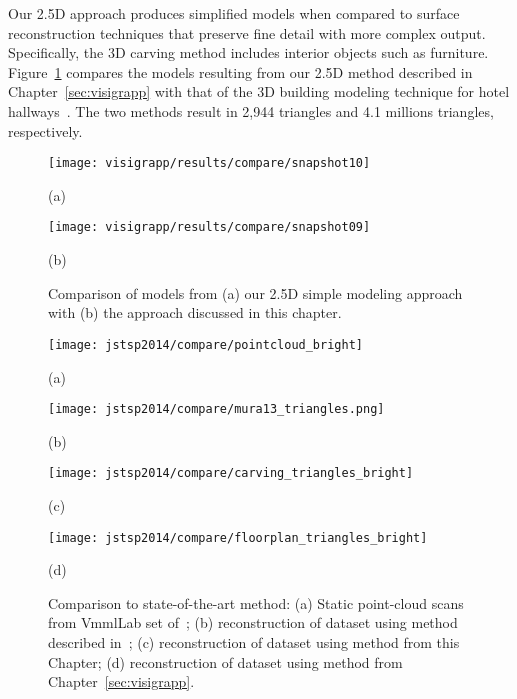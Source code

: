 \documentclass[12pt,onecolumn,oneside]{book}
\begin{document}
Our 2.5D approach produces simplified models when compared to surface reconstruction techniques that preserve fine detail with more complex output.  Specifically, the 3D carving method includes interior objects such as furniture.  Figure~\ref{fig:visigrapp_compare_to_carving} compares the models resulting from our 2.5D method described in Chapter~\ref{sec:visigrapp} with that of the 3D building modeling technique for hotel hallways~\cite{Turner14}.  The two methods result in 2,944 triangles and 4.1 millions triangles, respectively.

\begin{figure}
   \centering
   \begin{minipage}[b]{0.49\linewidth}
   \texttt{[image: visigrapp/results/compare/snapshot10]}
   \centerline{(a)}
   \end{minipage}
   \hfill
   \begin{minipage}[b]{0.49\linewidth}
   \texttt{[image: visigrapp/results/compare/snapshot09]}
   \centerline{(b)}
   \end{minipage}
   \caption[Comparison of 2.5D simple model with a 3D carved model.]{Comparison of models from (a) our 2.5D simple modeling approach with (b) the approach discussed in this chapter.}
   \label{fig:visigrapp_compare_to_carving}
\end{figure}

\begin{figure}[t]

	\begin{minipage}[b]{0.58\linewidth}
		\centerline{\texttt{[image: jstsp2014/compare/pointcloud\_bright]}}
		\centerline{(a)}\medskip
	\end{minipage}
	\hfill
	\begin{minipage}[b]{0.4\linewidth}
		\centerline{\texttt{[image: jstsp2014/compare/mura13\_triangles.png]}}
		\centerline{(b)}\medskip
	\end{minipage}
	\hfill
	\begin{minipage}[b]{0.58\linewidth}
		\centerline{\texttt{[image: jstsp2014/compare/carving\_triangles\_bright]}}
		\centerline{(c)}\medskip
	\end{minipage}
	\hfill
	\begin{minipage}[b]{0.4\linewidth}
		\centerline{\texttt{[image: jstsp2014/compare/floorplan\_triangles\_bright]}}
		\centerline{(d)}\medskip
	\end{minipage}

	\caption[Comparison of models to existing approach.]{Comparison to state-of-the-art method: (a) Static point-cloud scans from VmmlLab set of~\cite{Mattausch14}; (b) reconstruction of dataset using method described in~\cite{Mura13}; (c) reconstruction of dataset using method from this Chapter; (d) reconstruction of dataset using method from Chapter~\ref{sec:visigrapp}.}
	\label{fig:stateofartcompare}

\end{figure}
\end{document}
